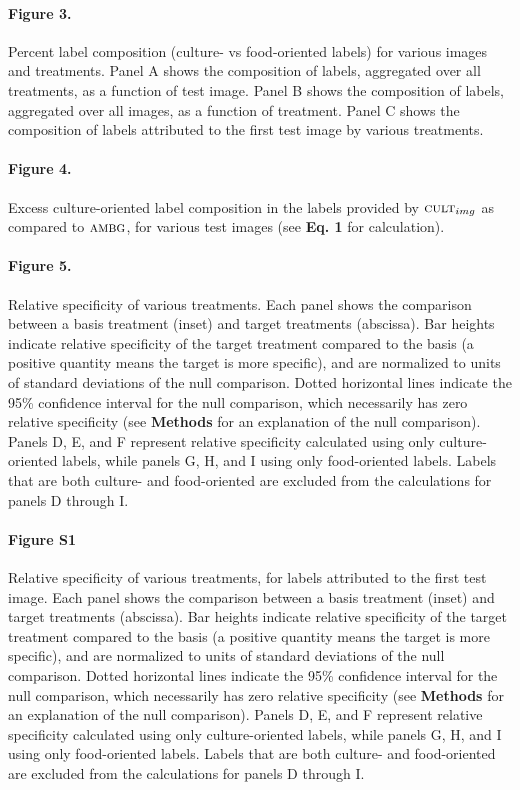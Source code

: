 \documentclass[a4paper]{report}
\begin{document}
\paragraph{Figure 3.}
Percent label composition (culture- vs food-oriented labels) for 
various images and treatments.  Panel A shows the composition of 
labels, aggregated over all treatments, as a function of test image.
Panel B shows the composition of labels, aggregated over all images, as
a function of treatment.  Panel C shows the composition of labels 
attributed to the first test image by various treatments.

\paragraph{Figure 4.}
Excess culture-oriented label composition in the labels provided
by $\textsc{cult}_{img}$ as compared to $\textsc{ambg}$, for various
test images (see \textbf{Eq. 1} for calculation).

\paragraph{Figure 5.}
Relative specificity of various treatments.
Each panel shows the comparison between a basis treatment (inset) and 
target treatments (abscissa).
Bar heights indicate relative specificity of the target 
treatment compared to the basis (a positive quantity means the target 
is more specific), and are normalized to units of standard 
deviations of the null comparison.  Dotted horizontal lines indicate
the 95\% confidence interval for the null comparison, which necessarily
has zero relative specificity (see \textbf{Methods} 
for an explanation of the null comparison).  Panels D, E, and F 
represent relative specificity calculated using only culture-oriented
labels, while panels G, H, and I using only food-oriented labels.
Labels that are both culture- and food-oriented are excluded from the
calculations for panels D through I.

\paragraph{Figure S1}
Relative specificity of various treatments, for labels attributed
to the first test image.
Each panel shows the comparison between a basis treatment (inset) and 
target treatments (abscissa).
Bar heights indicate relative specificity of the target 
treatment compared to the basis (a positive quantity means the target 
is more specific), and are normalized to units of standard 
deviations of the null comparison.  Dotted horizontal lines indicate
the 95\% confidence interval for the null comparison, which necessarily
has zero relative specificity (see \textbf{Methods} 
for an explanation of the null comparison).  Panels D, E, and F 
represent relative specificity calculated using only culture-oriented
labels, while panels G, H, and I using only food-oriented labels.
Labels that are both culture- and food-oriented are excluded from the
calculations for panels D through I.
\end{document}
